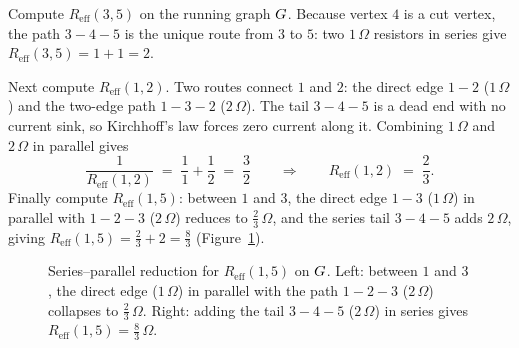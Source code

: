 \begin{example}\label{ch35:ex-reff}
Compute $R_{\mathrm{eff}}(3,5)$ on the running graph $G$. Because vertex $4$ is a cut vertex, the path $3\!-\!4\!-\!5$ is the unique route from $3$ to $5$: two $1\,\Omega$ resistors in series give $R_{\mathrm{eff}}(3,5)=1+1=2$.

Next compute $R_{\mathrm{eff}}(1,2)$. Two routes connect $1$ and $2$: the direct edge $1\!-\!2$ ($1\,\Omega$) and the two-edge path $1\!-\!3\!-\!2$ ($2\,\Omega$). The tail $3\!-\!4\!-\!5$ is a dead end with no current sink, so Kirchhoff's law forces zero current along it. Combining $1\,\Omega$ and $2\,\Omega$ in parallel gives
\[
  \frac{1}{R_{\mathrm{eff}}(1,2)} \;=\; \frac11+\frac12 \;=\; \frac32
  \qquad\Longrightarrow\qquad
  R_{\mathrm{eff}}(1,2) \;=\; \frac23.
\]
Finally compute $R_{\mathrm{eff}}(1,5)$: between $1$ and $3$, the direct edge $1\!-\!3$ ($1\,\Omega$) in parallel with $1\!-\!2\!-\!3$ ($2\,\Omega$) reduces to $\frac23\,\Omega$, and the series tail $3\!-\!4\!-\!5$ adds $2\,\Omega$, giving $R_{\mathrm{eff}}(1,5)=\frac23+2=\frac83$ (Figure~\ref{ch35:fig-reduce}).

\begin{figure}[htbp]
\centering
{}
\caption{Series--parallel reduction for $R_{\mathrm{eff}}(1,5)$ on $G$. Left: between $1$ and $3$, the direct edge ($1\,\Omega$) in parallel with the path $1\!-\!2\!-\!3$ ($2\,\Omega$) collapses to $\frac{2}{3}\,\Omega$. Right: adding the tail $3\!-\!4\!-\!5$ ($2\,\Omega$) in series gives $R_{\mathrm{eff}}(1,5)=\frac{8}{3}\,\Omega$.}
\label{ch35:fig-reduce}
\end{figure}
\end{example}

